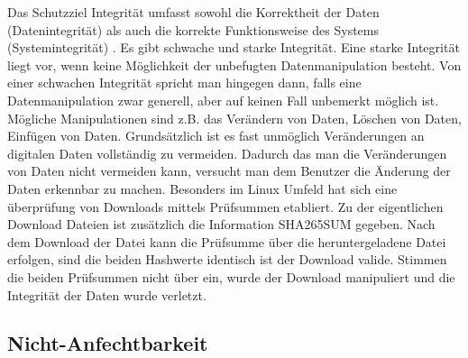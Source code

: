 \documentclass[utf8,biblatex]{lni}
\begin{document}
Das Schutzziel Integrität umfasst sowohl die Korrektheit der Daten (Datenintegrität) 
als auch die korrekte Funktionsweise des Systems (Systemintegrität) \cite{Kriha.2008}. 
Es gibt schwache und starke Integrität. 
Eine starke Integrität liegt vor, wenn keine Möglichkeit der unbefugten Datenmanipulation besteht. 
Von einer schwachen Integrität spricht man hingegen dann, falls eine Datenmanipulation zwar generell, 
aber auf keinen Fall unbemerkt möglich ist. 
Mögliche Manipulationen sind z.B. das
Verändern von Daten,
Löschen von Daten,
Einfügen von Daten.
Grundsätzlich ist es fast unmöglich Veränderungen an digitalen Daten vollständig zu vermeiden. 
Dadurch das man die Veränderungen von Daten nicht vermeiden kann, versucht man dem Benutzer die 
Änderung der Daten erkennbar zu machen. 
Besonders im Linux Umfeld hat sich eine überprüfung von Downloads mittels Prüfsummen etabliert.
Zu der eigentlichen Download Dateien ist zusätzlich die Information \glqq SHA265SUM\grqq{ } gegeben.
Nach dem Download der Datei kann die Prüfsumme über die heruntergeladene Datei erfolgen,
sind die beiden Hashwerte identisch ist der Download valide. 
Stimmen die beiden Prüfsummen nicht über ein, wurde der Download manipuliert und die 
Integrität der Daten wurde verletzt.

\subsection{Nicht-Anfechtbarkeit}
\end{document}
